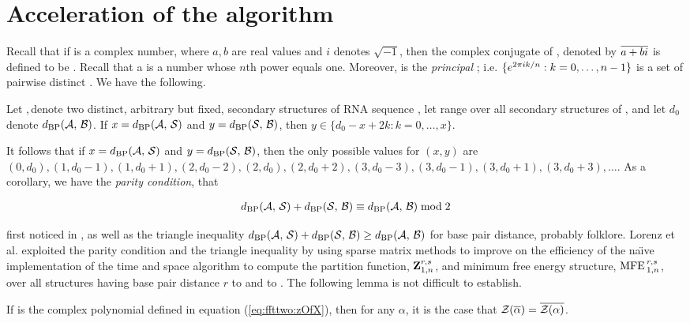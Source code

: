 \section{Acceleration of the \ffttwo algorithm}
\label{sec:ffttwo:perf}

Recall that if \aPbi is a complex number, where $a,b$ are real values and $i$
denotes $\sqrt{-1}$, then the complex conjugate of \aPbi, denoted by
$\overline{a+bi}$ is defined to be \aMbi. Recall that a \nRoU is a number
whose $n$th power equals one. Moreover,
\pRoU is the {\em principal} \nRoU; i.e.
$\{ e^{2 \pi i k/n} : k=0,\dots,n-1 \}$ is a set of pairwise distinct
\nRoUs. We have the following.

\begin{lemma}
\label{lem:ffttwo:lemma1}
Let \strA,\,\strB denote two distinct, arbitrary but fixed,
secondary structures of RNA sequence \seq, let \str range over
all secondary structures of \seq, and let $d_0$ denote $d_{\text{BP}}(\mathcal A,\,\mathcal B)$.
If $x=d_{\text{BP}}(\mathcal A,\,\mathcal S)$ and $y=d_{\text{BP}}(\mathcal S,\,\mathcal B)$, then
$y \in \{ d_0-x+2k: k=0,\dots,x\}$.

It follows that if $x=d_{\text{BP}}(\mathcal A,\,\mathcal S)$ and $y=d_{\text{BP}}(\mathcal S,\,\mathcal B)$,
then the only possible values for
$(x,y)$ are $(0,d_0), (1,d_0-1), (1,d_0+1),
(2,d_0-2), (2,d_0), (2, d_0+2),
(3,d_0-3), (3,d_0-1), (3, d_0+1), (3,d_0+3), \dots$.
As a corollary, we have the {\em parity condition}, that

\begin{align}
\label{eq:ffttwo:parity}
\dBP{\strA}{\str} + \dBP{\str}{\strB} \equiv \dBP{\strA}{\strB} \bmod 2
\end{align}

first noticed in \cite{hofacker:RNAbor2D}, as well as
the triangle inequality
$d_{\text{BP}}(\mathcal A,\,\mathcal S) + d_{\text{BP}}(\mathcal S,\,\mathcal B) \geq d_{\text{BP}}(\mathcal A,\,\mathcal B)$
for base pair distance, probably folklore.
Lorenz et al. \cite{hofacker:RNAbor2D} exploited the parity condition
and the triangle inequality by using sparse matrix methods to improve on
the efficiency of the na\"{\i}ve implementation of the
 time and  space algorithm to compute
the partition function, ${\bf Z}^{r,s}_{1,n}$,
and minimum free energy structure, $\text{MFE\,}^{r,s}_{1,n}$, over all
structures having base pair distance $r$ to \strA and \str to \strB.
The following lemma is not difficult to establish.
\end{lemma}

\begin{lemma}
\label{lem:ffttwo:lemma2}
If \emZ{} is the complex polynomial defined in
equation (\ref{eq:ffttwo:zOfX}), then for any \nRoU
$\alpha$, it is the case that ${\mathcal Z}_{}(\overline{\alpha}) =
\overline{{\mathcal Z}_{}(\alpha)}$.
\end{lemma}


